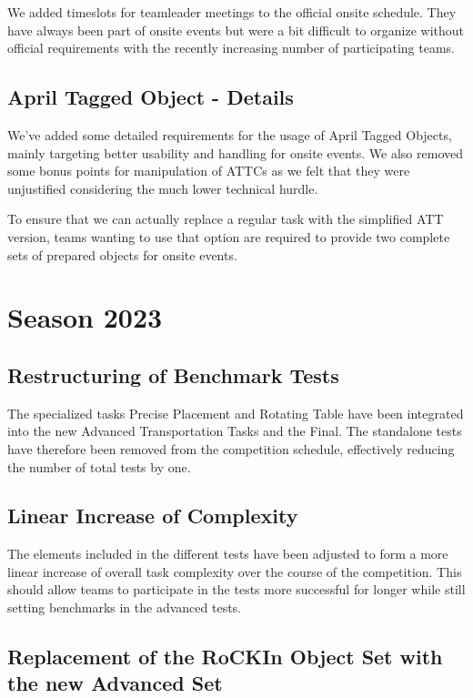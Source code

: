 We added timeslots for teamleader meetings to the official onsite schedule.
They have always been part of onsite events but were a bit difficult to organize without official requirements 
with the recently increasing number of participating teams.

\subsection{April Tagged Object - Details}

We've added some detailed requirements for the usage of April Tagged Objects,
mainly targeting better usability and handling for onsite events.
We also removed some bonus points for manipulation of ATTCs as we felt that they were unjustified
considering the much lower technical hurdle.

To ensure that we can actually replace a regular task with the simplified ATT version,
teams wanting to use that option are required to provide two complete sets of prepared objects for onsite events.

\section{Season 2023}

\subsection{Restructuring of Benchmark Tests}

The specialized tasks Precise Placement and Rotating Table have been integrated into the new Advanced Transportation Tasks and the Final.
The standalone tests have therefore been removed from the competition schedule, effectively reducing the number of total tests by one.

\subsection{Linear Increase of Complexity}

The elements included in the different tests have been adjusted to form a more linear increase of overall task complexity over the course of the competition. This should allow teams to participate in the tests more successful for longer while still setting benchmarks in the advanced tests.

\subsection{Replacement of the RoCKIn Object Set with the new Advanced Set}

